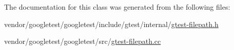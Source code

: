 The documentation for this class was generated from the following files\+:\begin{DoxyCompactItemize}
\item 
vendor/googletest/googletest/include/gtest/internal/\hyperlink{gtest-filepath_8h}{gtest-\/filepath.\+h}\item 
vendor/googletest/googletest/src/\hyperlink{gtest-filepath_8cc}{gtest-\/filepath.\+cc}\end{DoxyCompactItemize}
